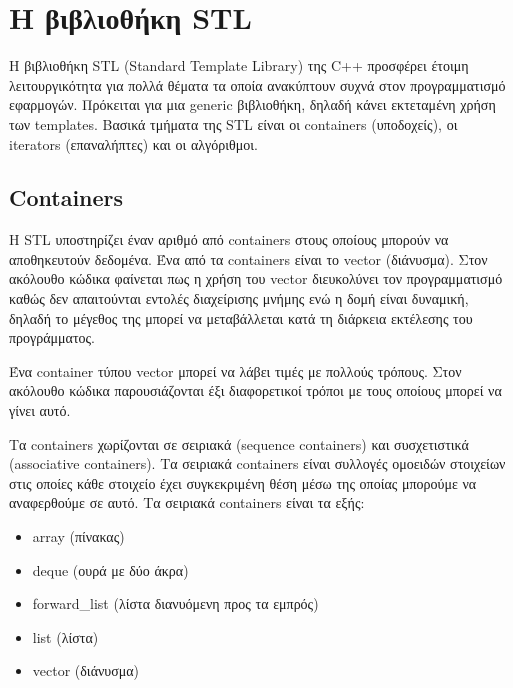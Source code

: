 



\section{Η βιβλιοθήκη STL}
Η βιβλιοθήκη STL (Standard Template Library) της C++ προσφέρει έτοιμη λειτουργικότητα για πολλά θέματα τα οποία ανακύπτουν συχνά στον προγραμματισμό εφαρμογών. Πρόκειται για μια generic βιβλιοθήκη, δηλαδή κάνει εκτεταμένη χρήση των templates. Βασικά τμήματα της STL είναι οι containers (υποδοχείς), οι iterators (επαναλήπτες) και οι αλγόριθμοι.

\subsection{Containers}
H STL υποστηρίζει έναν αριθμό από containers στους οποίους μπορούν να αποθηκευτούν δεδομένα. Ένα από τα containers είναι το vector (διάνυσμα). Στον ακόλουθο κώδικα φαίνεται πως η χρήση του vector διευκολύνει τον προγραμματισμό καθώς δεν απαιτούνται εντολές διαχείρισης μνήμης ενώ η δομή είναι δυναμική, δηλαδή το μέγεθος της μπορεί να μεταβάλλεται κατά τη διάρκεια εκτέλεσης του προγράμματος. 





Ένα container τύπου vector μπορεί να λάβει τιμές με πολλούς τρόπους. Στον ακόλουθο κώδικα παρουσιάζονται έξι διαφορετικοί τρόποι με τους οποίους μπορεί να γίνει αυτό.




Τα containers χωρίζονται σε σειριακά (sequence containers) και συσχετιστικά (associative containers). Τα σειριακά containers είναι συλλογές ομοειδών στοιχείων στις οποίες κάθε στοιχείο  έχει συγκεκριμένη θέση μέσω της οποίας μπορούμε να αναφερθούμε σε αυτό. Τα σειριακά containers είναι τα εξής: 
\begin{itemize}[noitemsep]
\item array (πίνακας) 
\item deque (ουρά με δύο άκρα)
\item forward\_list (λίστα διανυόμενη προς τα εμπρός)
\item list (λίστα)
\item vector (διάνυσμα)
\end{itemize}

